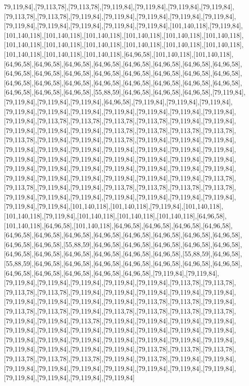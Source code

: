 79,119,84],[79,113,78],[79,113,78],[79,119,84],[79,119,84],[79,119,84],[79,119,84],[79,113,78],[79,113,78],[79,119,84],[79,119,84],[79,119,84],[79,119,84],[79,119,84],[79,119,84],[79,119,84],[79,119,84],[79,119,84],[79,119,84],[101,140,118],[79,119,84],[101,140,118],[101,140,118],[101,140,118],[101,140,118],[101,140,118],[101,140,118],[101,140,118],[101,140,118],[101,140,118],[101,140,118],[101,140,118],[101,140,118],[101,140,118],[101,140,118],[101,140,118],[64,96,58],[101,140,118],[101,140,118],[64,96,58],[64,96,58],[64,96,58],[64,96,58],[64,96,58],[64,96,58],[64,96,58],[64,96,58],[64,96,58],[64,96,58],[64,96,58],[64,96,58],[64,96,58],[64,96,58],[64,96,58],[64,96,58],[64,96,58],[64,96,58],[64,96,58],[64,96,58],[64,96,58],[64,96,58],[64,96,58],[64,96,58],[64,96,58],[64,96,58],[64,96,58],[55,88,59],[64,96,58],[64,96,58],[64,96,58],[79,119,84],[79,119,84],[79,119,84],[79,119,84],[64,96,58],[79,119,84],[79,119,84],[79,119,84],[79,119,84],[79,119,84],[79,119,84],[79,119,84],[79,119,84],[79,119,84],[79,119,84],[79,119,84],[79,113,78],[79,113,78],[79,113,78],[79,113,78],[79,119,84],[79,119,84],[79,119,84],[79,119,84],[79,119,84],[79,113,78],[79,113,78],[79,113,78],[79,113,78],[79,113,78],[79,119,84],[79,119,84],[79,113,78],[79,119,84],[79,119,84],[79,119,84],[79,119,84],[79,119,84],[79,119,84],[79,119,84],[79,119,84],[79,119,84],[79,119,84],[79,119,84],[79,119,84],[79,119,84],[79,119,84],[79,119,84],[79,119,84],[79,119,84],[79,119,84],[79,119,84],[79,119,84],[79,119,84],[79,119,84],[79,119,84],[79,119,84],[79,119,84],[79,119,84],[79,119,84],[79,119,84],[79,119,84],[79,119,84],[79,113,78],[79,113,78],[79,119,84],[79,119,84],[79,113,78],[79,113,78],[79,113,78],[79,113,78],[79,119,84],[79,119,84],[79,119,84],[79,119,84],[79,119,84],[79,119,84],[79,119,84],[79,119,84],[79,119,84],[101,140,118],[101,140,118],[79,119,84],[101,140,118],[101,140,118],[79,119,84],[101,140,118],[101,140,118],[101,140,118],[64,96,58],[101,140,118],[64,96,58],[101,140,118],[64,96,58],[64,96,58],[64,96,58],[64,96,58],[64,96,58],[64,96,58],[64,96,58],[64,96,58],[64,96,58],[64,96,58],[64,96,58],[64,96,58],[64,96,58],[64,96,58],[55,88,59],[64,96,58],[64,96,58],[64,96,58],[64,96,58],[64,96,58],[64,96,58],[64,96,58],[64,96,58],[64,96,58],[64,96,58],[64,96,58],[55,88,59],[64,96,58],[55,88,59],[64,96,58],[64,96,58],[64,96,58],[64,96,58],[64,96,58],[64,96,58],[64,96,58],[64,96,58],[64,96,58],[64,96,58],[64,96,58],[64,96,58],[79,119,84],[79,119,84],[79,119,84],[79,119,84],[79,119,84],[79,119,84],[79,119,84],[79,113,78],[79,113,78],[79,113,78],[79,113,78],[79,119,84],[79,119,84],[79,119,84],[79,119,84],[79,119,84],[79,119,84],[79,119,84],[79,119,84],[79,119,84],[79,113,78],[79,113,78],[79,119,84],[79,113,78],[79,113,78],[79,119,84],[79,113,78],[79,113,78],[79,113,78],[79,113,78],[79,119,84],[79,119,84],[79,113,78],[79,119,84],[79,119,84],[79,119,84],[79,119,84],[79,119,84],[79,119,84],[79,119,84],[79,119,84],[79,119,84],[79,119,84],[79,119,84],[79,119,84],[79,119,84],[79,119,84],[79,119,84],[79,119,84],[79,119,84],[79,119,84],[79,119,84],[79,119,84],[79,119,84],[79,119,84],[79,113,78],[79,113,78],[79,113,78],[79,113,78],[79,113,78],[79,113,78],[79,119,84],[79,113,78],[79,119,84],[79,119,84],[79,119,84],[79,119,84],[79,119,84],[79,119,84],[79,119,84],[79,119,84],[79,119,84],[79,119,84],[79,119,84],[79,119,84],[79,119,84]